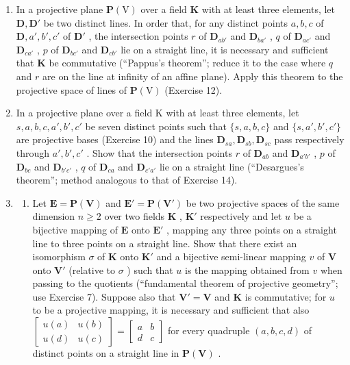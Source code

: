 \begin{enumerate}
\def\labelenumi{\arabic{enumi}.}
\setcounter{enumi}{13}
\item
  In a projective plane \(\mathbf{P}(\mathrm{V})\) over a field \(\mathbf{K}\) with at least three elements, let \(\mathbf{D}, \mathbf{D}'\) be two distinct lines. In order that, for any distinct points \(a, b, c\) of \(\mathbf{D}, a', b', c'\) of \(\mathbf{D}'\) , the intersection points \(r\) of \(\mathbf{D}_{ab'}\) and \(\mathbf{D}_{ba'}\) , \(q\) of \(\mathbf{D}_{ac'}\) and \(\mathbf{D}_{ca'}\) , \(p\) of \(\mathbf{D}_{bc'}\) and \(\mathbf{D}_{cb'}\) lie on a straight line, it is necessary and sufficient that \(\mathbf{K}\) be commutative (``Pappus's theorem''; reduce it to the case where \(q\) and \(r\) are on the line at infinity of an affine plane). Apply this theorem to the projective space of lines of \(\mathbf{P}(\mathrm{V})\) (Exercise 12).
\item
  In a projective plane over a field K with at least three elements, let \(s, a, b, c, a', b', c'\) be seven distinct points such that \(\{s, a, b, c\}\) and \(\{s, a', b', c'\}\) are projective bases (Exercise 10) and the lines \(\mathbf{D}_{sa}, \mathbf{D}_{sb}, \mathbf{D}_{sc}\) pass respectively through \(a', b', c'\) . Show that the intersection points \(r\) of \(\mathbf{D}_{ab}\) and \(\mathbf{D}_{a'b'}\) , \(p\) of \(\mathbf{D}_{bc}\) and \(\mathbf{D}_{b'c'}\) , \(q\) of \(\mathbf{D}_{ca}\) and \(\mathbf{D}_{c'a'}\) lie on a straight line (``Desargues's theorem''; method analogous to that of Exercise 14).
\item
  \begin{enumerate}
  \def\labelenumii{(\alph{enumii})}
  \tightlist
  \item
    Let \(\mathbf{E} = \mathbf{P}(\mathbf{V})\) and \(\mathbf{E}' = \mathbf{P}(\mathbf{V}')\) be two projective spaces of the same dimension \(n \geqslant 2\) over two fields \(\mathbf{K}\) , \(\mathbf{K}'\) respectively and let \(u\) be a bijective mapping of \(\mathbf{E}\) onto \(\mathbf{E}'\) , mapping any three points on a straight line to three points on a straight line. Show that there exist an isomorphism \(\sigma\) of \(\mathbf{K}\) onto \(\mathbf{K}'\) and a bijective semi-linear mapping \(v\) of \(\mathbf{V}\) onto \(\mathbf{V}'\) (relative to \(\sigma\) ) such that \(u\) is the mapping obtained from \(v\) when passing to the quotients (``fundamental theorem of projective geometry''; use Exercise 7). Suppose also that \(\mathbf{V}' = \mathbf{V}\) and \(\mathbf{K}\) is commutative; for \(u\) to be a projective mapping, it is necessary and sufficient that also \(\begin{bmatrix} u(a) & u(b) \\ u(d) & u(c) \end{bmatrix} = \begin{bmatrix} a & b \\ d & c \end{bmatrix}\) for every quadruple \((a, b, c, d)\) of distinct points on a straight line in \(\mathbf{P}(\mathbf{V})\) .
  \end{enumerate}
\end{enumerate}

